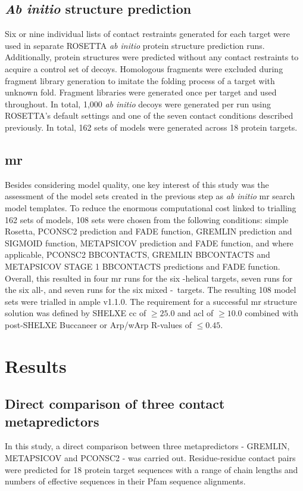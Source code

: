 \subsection{\textit{Ab initio} structure prediction}
Six or nine individual lists of contact restraints generated for each target were used in separate ROSETTA \textit{ab initio} protein structure prediction runs. Additionally, protein structures were predicted without any contact restraints to acquire a control set of decoys. Homologous fragments were excluded during fragment library generation to imitate the folding process of a target with unknown fold. Fragment libraries were generated once per target and used throughout. In total, 1,000 \textit{ab initio} decoys were generated per run using ROSETTA’s default settings \cite{Rohl2004-ou} and one of the seven contact conditions described previously. In total, 162 sets of models were generated across 18 protein targets.

\subsection{\acrlong{mr}}
Besides considering model quality, one key interest of this study was the assessment of the model sets created in the previous step as \textit{ab initio} \gls{mr} search model templates. To reduce the enormous computational cost linked to trialling 162 sets of models, 108 sets were chosen from the following conditions: simple Rosetta, PCONSC2 prediction and FADE function, GREMLIN prediction and SIGMOID function, METAPSICOV prediction and FADE function, and where applicable, PCONSC2 BBCONTACTS, GREMLIN BBCONTACTS and METAPSICOV STAGE 1 BBCONTACTS predictions and FADE function. Overall, this resulted in four \gls{mr} runs for the six \textalpha-helical targets, seven runs for the six all-\textbeta, and seven runs for the six mixed \textalpha-\textbeta\ targets. The resulting 108 model sets were trialled in \gls{ample} v1.1.0. The requirement for a successful \gls{mr} structure solution was defined by SHELXE \gls{cc} of $\geq25.0$ and \gls{acl} of $\geq10.0$ combined with post-SHELXE Buccaneer \cite{} or Arp/wArp \cite{} R-values of $\leq0.45$.

\section{Results}
\subsection{Direct comparison of three contact metapredictors}
In this study, a direct comparison between three metapredictors - GREMLIN, METAPSICOV and PCONSC2 - was carried out. Residue-residue contact pairs were predicted for 18 protein target sequences with a range of chain lengths and numbers of effective sequences in their Pfam sequence alignments.

